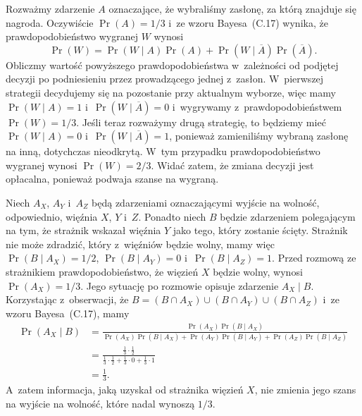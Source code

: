 \exercise %
Rozważmy zdarzenie $A$ oznaczające, że wybraliśmy zasłonę, za którą znajduje się nagroda. Oczywiście $\Pr(A)=1/3$ i~ze wzoru Bayesa~(C.17) wynika, że prawdopodobieństwo wygranej $W$ wynosi
\[
	\Pr(W) = \Pr(W\mid A)\Pr(A)+\Pr(W\mid\overline{A})\Pr(\overline{A}).
\]
Obliczmy wartość powyższego prawdopodobieństwa w~zależności od podjętej decyzji po podniesieniu przez prowadzącego jednej z~zasłon. W~pierwszej strategii decydujemy się na pozostanie przy aktualnym wyborze, więc mamy $\Pr(W\mid A)=1$ i~$\Pr(W\mid\overline{A})=0$ i~wygrywamy z~prawdopodobieństwem $\Pr(W)=1/3$. Jeśli teraz rozważymy drugą strategię, to będziemy mieć $\Pr(W\mid A)=0$ i~$\Pr(W\mid\overline{A})=1$, ponieważ zamieniliśmy wybraną zasłonę na inną, dotychczas nieodkrytą. W~tym przypadku prawdopodobieństwo wygranej wynosi $\Pr(W)=2/3$. Widać zatem, że zmiana decyzji jest opłacalna, ponieważ podwaja szanse na wygraną.

\exercise %
Niech $A_X$, $A_Y$ i~$A_Z$ będą zdarzeniami oznaczającymi wyjście na wolność, odpowiednio, więźnia $X$, $Y$ i~$Z$. Ponadto niech $B$ będzie zdarzeniem polegającym na tym, że strażnik wskazał więźnia $Y$ jako tego, który zostanie ścięty. Strażnik nie może zdradzić, który z~więźniów będzie wolny, mamy więc $\Pr(B\mid A_X)=1/2$, $\Pr(B\mid A_Y)=0$ i~$\Pr(B\mid A_Z)=1$. Przed rozmową ze strażnikiem prawdopodobieństwo, że więzień $X$ będzie wolny, wynosi $\Pr(A_X)=1/3$. Jego sytuację po rozmowie opisuje zdarzenie $A_X\mid B$. Korzystając z~obserwacji, że $B=(B\cap A_X)\cup(B\cap A_Y)\cup(B\cap A_Z)$ i~ze wzoru Bayesa~(C.17), mamy
\begin{align*}
    \Pr(A_X\mid B) &= \frac{\Pr(A_X)\Pr(B\mid A_X)}{\Pr(A_X)\Pr(B\mid A_X)+\Pr(A_Y)\Pr(B\mid A_Y)+\Pr(A_Z)\Pr(B\mid A_Z)} \\
	&= \frac{\frac{1}{3}\cdot\frac{1}{2}}{\frac{1}{3}\cdot\frac{1}{2}+\frac{1}{3}\cdot0+\frac{1}{3}\cdot1} \\[2mm]
	&= \frac{1}{3}.
\end{align*}
A~zatem informacja, jaką uzyskał od strażnika więzień $X$, nie zmienia jego szans na wyjście na wolność, które nadal wynoszą $1/3$.


